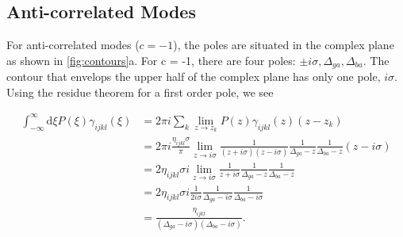 \documentclass[aip, jcp, reprint, onecolumn, nofootinbib]{revtex4-2}
\begin{document}
\subsection{Anti-correlated Modes}
For anti-correlated modes ($c = -1$), the poles are situated in the complex plane as shown in \autoref{fig:contours}a.
For c = -1, there are four poles: $\pm i \sigma, \Delta_{ga}, \Delta_{ba}$. 
The contour that envelops the upper half of the complex plane has only one pole, $i \sigma$.
Using the residue theorem for a first order pole,\cite{Carlson1990line} we see
\begin{widetext}
	\begin{equation}
		\begin{split}
			\int_{-\infty}^\infty \mathrm{d}\xi P(\xi) \gamma_{ijkl}(\xi) &= 2\pi i \sum_k \lim_{z \rightarrow z_k} P(z) \gamma_{ijkl}(z) (z - z_k)\\
			&= 2\pi i \frac{\eta_{ijkl} \sigma}{\pi} \lim_{z \rightarrow i\sigma} \frac{1}{(z + i\sigma)(z- i\sigma)} \frac{1}{\Delta_{ga} - z} \frac{1}{\Delta_{ba} - z} (z - i \sigma)\\
			&= 2 \eta_{ijkl} \sigma i \lim_{z \rightarrow i\sigma} \frac{1}{z + i\sigma} \frac{1}{\Delta_{ga} - z} \frac{1}{\Delta_{ba} - z}\\
			&= 2\eta_{ijkl} \sigma i \frac{1}{2i\sigma} \frac{1}{\Delta_{ga} - i\sigma} \frac{1}{\Delta_{ba} - i\sigma}\\
			&= \frac{\eta_{ijkl}}{\left(\Delta_{ga}-i\sigma\right)\left(\Delta_{ba}-i \sigma\right)}.\\
		\end{split}
	\end{equation}
\end{widetext}
\end{document}
